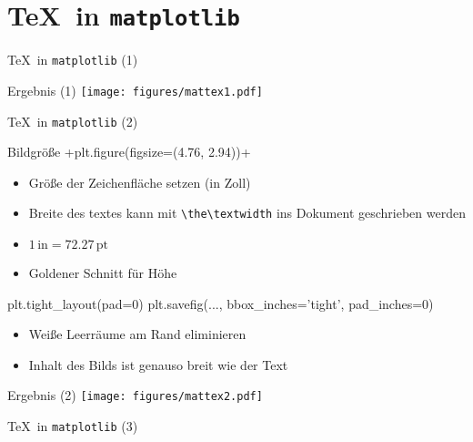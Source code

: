 \section{\TeX\ in \texttt{matplotlib}}

\begin{frame}[fragile]{\TeX\ in \texttt{matplotlib} (1)}
\end{frame}

\AddToShipoutPictureFG*{\ShowFramePicture}
\begin{frame}{Ergebnis (1)}
  \centering
  \texttt{[image: figures/mattex1.pdf]}
\end{frame}

\begin{frame}[fragile]{\TeX\ in \texttt{matplotlib} (2)}
\end{frame}

\begin{frame}[fragile]{Bildgröße}
  \lstpythoninline+plt.figure(figsize=(4.76, 2.94))+
  \begin{itemize}
    \item Größe der Zeichenfläche setzen (in Zoll)
    \item Breite des textes kann mit \lstinline+\the\textwidth+ ins Dokument geschrieben werden
    \item $1\,\mathrm{in} = \num{72.27}\,\mathrm{pt}$
    \item Goldener Schnitt für Höhe
  \end{itemize}

  \begin{lstpython}
    plt.tight_layout(pad=0)
    plt.savefig(..., bbox_inches='tight', pad_inches=0)
  \end{lstpython}
  \begin{itemize}
    \item Weiße Leerräume am Rand eliminieren
    \item Inhalt des Bilds ist genauso breit wie der Text
  \end{itemize}
\end{frame}

\AddToShipoutPictureFG*{\ShowFramePicture}
\begin{frame}{Ergebnis (2)}
  \centering
  \texttt{[image: figures/mattex2.pdf]}
\end{frame}

\begin{frame}[fragile]{\TeX\ in \texttt{matplotlib} (3)}
\end{frame}

